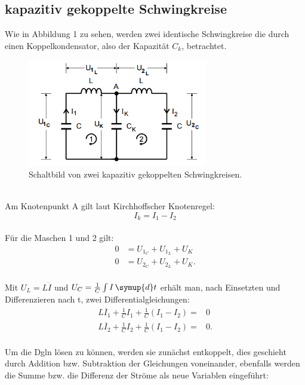 \subsection{kapazitiv gekoppelte Schwingkreise}
Wie in Abbildung 1 zu sehen, werden zwei identische Schwingkreise die durch einen Koppelkondensator, also der Kapazität $C_k$,
betrachtet.
  \begin{figure}
    \centering
    \includegraphics[width=0.7\textwidth]{Prinzipschaltbild.PNG}
    \caption{Schaltbild von zwei kapazitiv gekoppelten Schwingkreisen.\cite{skript}}
    \label{abb:SchaltbildSchwingkreis}
    \end{figure}\\
\newpage
Am Knotenpunkt A gilt laut Kirchhoffscher Knotenregel:\\
 \begin{equation}
   I_k = I_1 - I_2
 \end{equation}\\
 Für die Maschen 1 und 2 gilt:
 \begin{align}
  0&= U_{1_C} + U_{1_L} + U_K \label{eqn:maschenregel1}\\
  0&= U_{2_C} + U_{2_L} + U_K \label{eqn:maschenregel2}.
 \end{align}\\
Mit $U_L=L\dot{I}$ und $U_C = \frac{1}{C}\int I\, \symup{d}t$ erhält man, nach Einsetzten und Differenzieren nach t, zwei Differentialgleichungen:\\
\begin{align}
  L\ddot{I_1} + \frac{1}{C}I_1 + \frac{1}{C}  (I_1-I_2) =&0\\
  L\ddot{I_2} + \frac{1}{C}I_2 + \frac{1}{C}  (I_1-I_2) =&0.
\end{align}\\
Um die Dgln lösen zu können, werden sie zunächst entkoppelt, dies geschieht durch Addition bzw. Subtraktion der Gleichungen voneinander,
ebenfalls werden die Summe bzw. die Differenz der Ströme als neue Variablen eingeführt:\\

